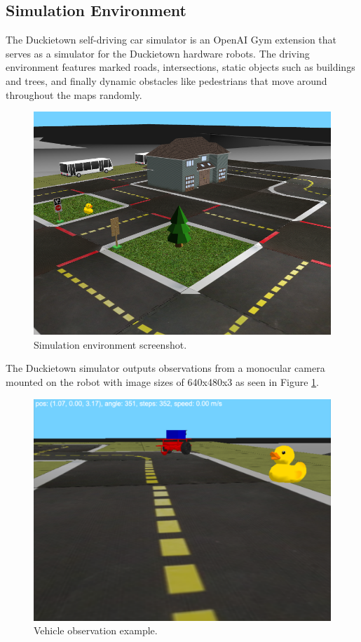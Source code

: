 \documentclass[conference]{IEEEtran}
\begin{document}
\subsection{Simulation Environment}
The Duckietown self-driving car simulator is an OpenAI Gym extension that serves as a 
simulator for the Duckietown hardware robots. The driving environment features marked roads, 
intersections, static objects such as buildings and trees, and finally dynamic obstacles 
like pedestrians that move around throughout the maps randomly. \par
\begin{figure}[H]
  \centering
    \includegraphics[scale=0.25]{simplesim_free.png}
  \caption{Simulation environment screenshot.}
\end{figure}
The Duckietown simulator outputs observations from a monocular camera mounted on the robot
with image sizes of 640x480x3 as seen in Figure \ref{fig:obs}. \par 
\begin{figure}[H]
  \centering
    \includegraphics[scale=0.25]{first_person.png}
  \caption{Vehicle observation example.}
  \label{fig:obs}
\end{figure}
\end{document}

